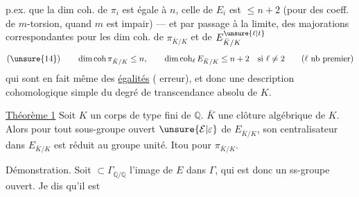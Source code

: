 p.ex. que la dim coh. de $\pi_i$ est égale à $n$, celle de $E_i$ est $\leq n+2$ (pour des coeff.  de $m$-torsion, quand $m$ est impair) --- et par passage à la limite, des majorations correspondantes pour les dim coh. de $\pi_{\bar K/K}$ et de $E_{\bar K/K}^{\unsure{\ell|t}}$
\[
(\unsure{14})\qquad \dim\operatorname{coh}\pi_{\bar K/K}\leq n,\qquad
\dim\operatorname{coh}_{\ell}E_{\bar K/K}\leq n+2\quad\text{si }\ell\neq2
\qquad(\ell\text{ nb premier})
\]
qui sont en fait même des \uline{égalités} ( erreur), et  donc une description cohomologique simple du degré de transcendance absolu de $K$.

\uline{Théorème 1} Soit $K$ un corps  de type fini de $\mathbb Q$.  $\bar K$ une clôture algébrique de $K$. Alors pour tout sous-groupe ouvert $\unsure{\mathcal E|\varepsilon}$ de $E_{\bar K/K}$, son centralisateur dans $E_{\bar K/K}$ est réduit au groupe unité. Itou pour $\pi_{\bar K/K}$.

Démonstration. Soit $\subset\Gamma_{\overline{\mathbb Q}/\mathbb Q}$ l'image de $E$ dans $\Gamma$, qui est donc un ss-groupe ouvert.   Je dis qu'il est
